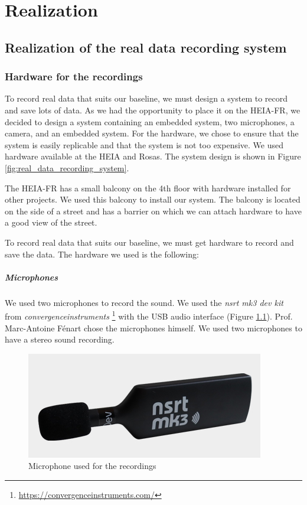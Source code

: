 \chapter{Realization}
\label{ch:setup}


\section{Realization of the real data recording system}

\subsection{Hardware for the recordings}
To record real data that suits our baseline, we must design a system to record and save lots of data. As we had the opportunity to place it on the HEIA-FR, we decided to design a system containing an embedded system, two microphones, a camera, and an embedded system. For the hardware, we chose to ensure that the system is easily replicable and that the system is not too expensive. We used hardware available at the HEIA and Rosas. The system design is shown in Figure \ref{fig:real_data_recording_system}.

The HEIA-FR has a small balcony on the 4th floor with hardware installed for other projects. We used this balcony to install our system. The balcony is located on the side of a street and has a barrier on which we can attach hardware to have a good view of the street. 

To record real data that suits our baseline, we must get hardware to record and save the data. The hardware we used is the following:

\paragraph{Microphones}
We used two microphones to record the sound. We used the \textit{nsrt mk3 dev kit} from \textit{convergenceinstruments} \footnote{\url{https://convergenceinstruments.com/}} with the USB audio interface (Figure \ref{fig:nsrt_mk3_mic}). Prof. Marc-Antoine Fénart chose the microphones himself. We used two microphones to have a stereo sound recording.

\begin{figure}[H]
    \centering
    \includegraphics[width=.5\textwidth]{images/nsrt_mk3_mic.png}
    \caption{Microphone used for the recordings}
    \label{fig:nsrt_mk3_mic}
\end{figure}

